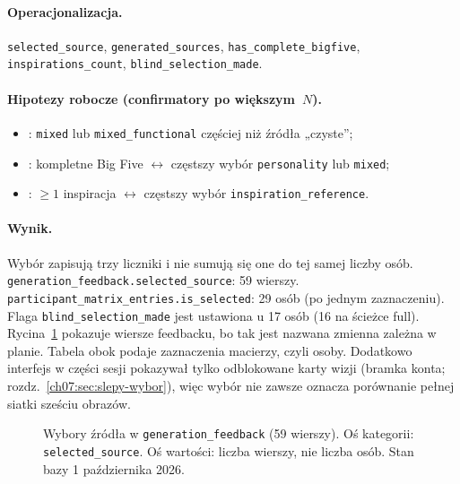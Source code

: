 \paragraph{Operacjonalizacja.}
\texttt{selected\_source}, \texttt{generated\_sources}, \texttt{has\_complete\_bigfive}, \texttt{inspirations\_count}, \texttt{blind\_selection\_made}.

\paragraph{Hipotezy robocze (confirmatory po większym~$N$).}
\begin{itemize}
  \item {}: \texttt{mixed} lub \texttt{mixed\_functional} częściej niż źródła „czyste”;
  \item {}: kompletne Big Five $\leftrightarrow$ częstszy wybór \texttt{personality} lub \texttt{mixed};
  \item {}: $\geq 1$ inspiracja $\leftrightarrow$ częstszy wybór \texttt{inspiration\_reference}.
\end{itemize}

\paragraph{Wynik.}
Wybór zapisują trzy liczniki i nie sumują się one do tej samej liczby osób. \texttt{generation\_feedback.selected\_source}: 59 wierszy. \texttt{participant\_matrix\_entries.is\_selected}: 29 osób (po jednym zaznaczeniu). Flaga \texttt{blind\_selection\_made} jest ustawiona u 17 osób (16 na ścieżce full). Rycina~\ref{fig:ch08:selected-source} pokazuje wiersze feedbacku, bo tak jest nazwana zmienna zależna w planie. Tabela obok podaje zaznaczenia macierzy, czyli osoby. Dodatkowo interfejs w części sesji pokazywał tylko odblokowane karty wizji (bramka konta; rozdz.~\ref{ch07:sec:slepy-wybor}), więc wybór nie zawsze oznacza porównanie pełnej siatki sześciu obrazów.

\begin{figure}[htbp]
  \centering
  \caption{Wybory źródła w \texttt{generation\_feedback} (59 wierszy). Oś kategorii: \texttt{selected\_source}. Oś wartości: liczba wierszy, nie liczba osób. Stan bazy 1 października 2026.}
  \label{fig:ch08:selected-source}
\end{figure}

